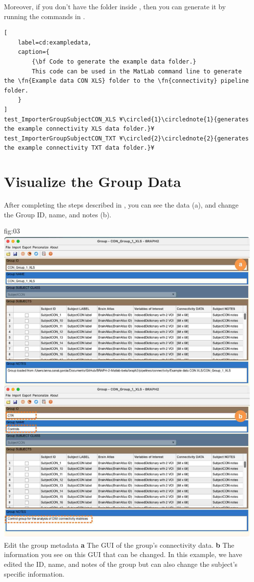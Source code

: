 \documentclass[justified]{tufte-handout}
\begin{document}
Moreover, if you don't have the  folder inside , then you can generate it by running the commands in .

\begin{lstlisting}[
	label=cd:exampledata,
	caption={
		{\bf Code to generate the example data folder.}
		This code can be used in the MatLab command line to generate the \fn{Example data CON XLS} folder to the \fn{connectivity} pipeline folder.
	}
]
test_ImporterGroupSubjectCON_XLS ¥\circled{1}\circlednote{1}{generates the example connectivity XLS data folder.}¥
test_ImporterGroupSubjectCON_TXT ¥\circled{2}\circlednote{2}{generates the example connectivity TXT data folder.}¥
\end{lstlisting}

\section{Visualize the Group Data}

After completing the steps described in , you can see the data (a), and change the Group ID, name, and notes (b). 

	{fig:03}
	{
	\includegraphics{fig03.jpg}
	}
	{Edit the group metadata}
	{ 
	{\bf a} The GUI of the group's connectivity data. 
	{\bf b} The information you see on this GUI that can be changed. In this example, we have edited the ID, name, and notes of the group but can also change the subject's specific information.
	}
\end{document}
